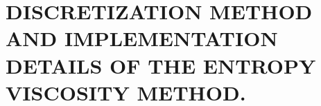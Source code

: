 %
%
%


\pagestyle{plain} %
\setcounter{page}{1}
\chapter{\uppercase {Discretization method and implementation details of the entropy viscosity method.}}
